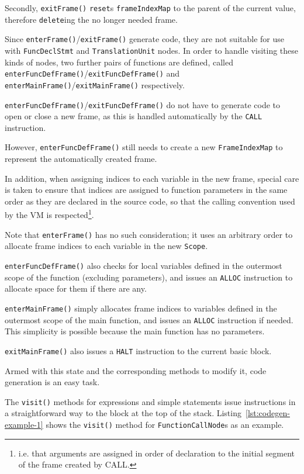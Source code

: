 \documentclass[11pt,a4paper]{scrartcl}
\begin{document}
\begin{itemize}
        Secondly, \verb|exitFrame()| \verb|reset|s \verb|frameIndexMap| to the parent of the current value, therefore \verb|delete|ing the no longer needed frame.

        Since \verb|enterFrame()|/\verb|exitFrame()| generate code, they are not suitable for use with \verb|FuncDeclStmt| and \verb|TranslationUnit| nodes. In order to handle visiting these kinds of nodes, two further pairs of functions are defined, called \verb|enterFuncDefFrame()|/\verb|exitFuncDefFrame()| and \verb|enterMainFrame()|/\verb|exitMainFrame()| respectively.

        \verb|enterFuncDefFrame()|/\verb|exitFuncDefFrame()| do not have to generate code to open or close a new frame, as this is handled automatically by the \verb|CALL| instruction.

        However, \verb|enterFuncDefFrame()| still needs to create a new \verb|FrameIndexMap| to represent the automatically created frame.

        In addition, when assigning indices to each variable in the new frame, special care is taken to ensure that indices are assigned to function parameters in the same order as they are declared in the source code, so that the calling convention used by the VM is respected\footnote{i.e. that arguments are assigned in order of declaration to the initial segment of the frame created by CALL.}.

        Note that \verb|enterFrame()| has no such consideration; it uses an arbitrary order to allocate frame indices to each variable in the new \verb|Scope|.

        \verb|enterFuncDefFrame()| also checks for local variables defined in the outermost scope of the function (excluding parameters), and issues an \verb|ALLOC| instruction to allocate space for them if there are any.

        \verb|enterMainFrame()| simply allocates frame indices to variables defined in the outermost scope of the main function, and issues an \verb|ALLOC| instruction if needed. This simplicity is possible because the main function has no parameters.

        \verb|exitMainFrame()| also issues a \verb|HALT| instruction to the current basic block.
\end{itemize}

Armed with this state and the corresponding methods to modify it, code generation is an easy task.

The \verb|visit()| methods for expressions and simple statements issue instructions in a straightforward way to the block at the top of the stack. Listing~\ref{lst:codegen-example-1} shows the \verb|visit()| method for \verb|FunctionCallNode|s as an example.
\end{document}
